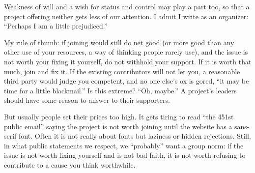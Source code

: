 Weakness of will and a wish for status and control may play a part too, so that a project offering neither gets less of our attention. I admit I write as an organizer: ``Perhaps I am a little prejudiced.''

My rule of thumb: if joining would still do net good (or more good than any other use of your resources, a way of thinking people rarely use), and the issue is not worth your fixing it yourself, do not withhold your support. If it is worth that much, join and fix it. If the existing contributors will not let you, a reasonable third party would judge you competent, and no one else's ox is gored, ``it may be time for a little blackmail.'' Is this extreme? ``Oh, maybe.'' A project's leaders should have some reason to answer to their supporters.

But usually people set their prices too high. It gets tiring to read ``the 451st public email'' saying the project is not worth joining until the website has a sans-serif font. Often it is not really about fonts but laziness or hidden rejections. Still, in what public statements we respect, we ``probably'' want a group norm: if the issue is not worth fixing yourself and is not bad faith, it is not worth refusing to contribute to a cause you think worthwhile.
